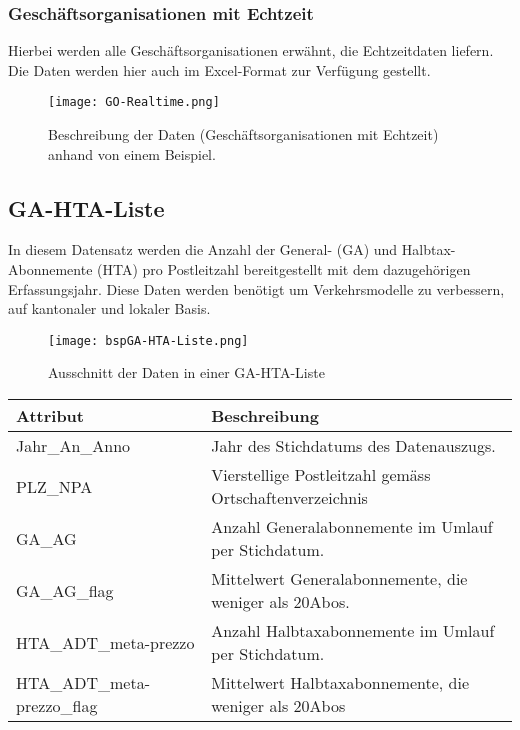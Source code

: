 \subsubsection{Geschäftsorganisationen mit Echtzeit}
\label{Geschaeftsorganisationen mit Echtzeit}
Hierbei werden alle Geschäftsorganisationen erwähnt, die Echtzeitdaten liefern. Die Daten werden hier auch im Excel-Format zur Verfügung gestellt.

\begin{figure}[]
	\centering
	\texttt{[image: GO-Realtime.png]}
	\caption{Beschreibung der Daten (Geschäftsorganisationen mit Echtzeit) anhand von einem Beispiel.\cite{geschaeftsorganisation-rt}}
	\label{fig:Uebersicht Geschaeftsorganisationen Echtzeit}
\end{figure}

\subsection{GA-HTA-Liste}
\label{GA-HTA-Liste}
In diesem Datensatz werden die Anzahl der General- (GA) und Halbtax-Abonnemente (HTA) pro Postleitzahl bereitgestellt mit dem dazugehörigen Erfassungsjahr. Diese Daten werden benötigt um Verkehrsmodelle zu verbessern, auf kantonaler und lokaler Basis.

\begin{figure}[]
	\centering
	\texttt{[image: bspGA-HTA-Liste.png]}
	\caption{Ausschnitt der Daten in einer GA-HTA-Liste  \cite{gahtaliste}}
	\label{fig:Beispiel GA-HTA-Liste}
\end{figure}
\begin{tabular}{|l|l|}  \hline
	Attribut & Beschreibung \\ \hline
	Jahr\_An\_Anno & Jahr des Stichdatums des Datenauszugs.  \\ \hline
	PLZ\_NPA & Vierstellige Postleitzahl gemäss Ortschaftenverzeichnis \\ \hline
	GA\_AG & Anzahl Generalabonnemente im Umlauf per Stichdatum. \\ \hline
	GA\_AG\_flag & Mittelwert Generalabonnemente, die weniger als 20Abos. \\ \hline
	HTA\_ADT\_meta-prezzo & Anzahl Halbtaxabonnemente im Umlauf per Stichdatum. \\ \hline	
	HTA\_ADT\_meta-prezzo\_flag & Mittelwert Halbtaxabonnemente, die weniger als 20Abos \\ \hline
\end{tabular}


